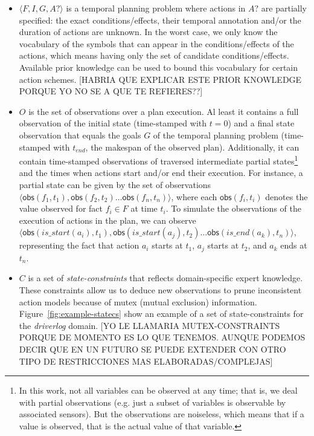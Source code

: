 \documentclass{ecai}
\newcommand{\tup}[1]{{\langle #1 \rangle}}
\newcommand{\obs}{\mathsf{obs}}    %
\begin{document}
\begin{itemize}
	
\item $\tup{F,I,G,A?}$ is a temporal planning problem where actions in $A?$ are partially specified: the exact conditions/effects, their temporal annotation and/or the duration of actions are unknown. In the worst case, we only know the vocabulary of the symbols that can appear in the conditions/effects of the actions, which means having only the set of candidate conditions/effects. 
Available prior knowledge can be used to bound this vocabulary for certain action schemes. [HABRIA QUE EXPLICAR ESTE PRIOR KNOWLEDGE PORQUE YO NO SE A QUE TE REFIERES??]

\item $O$ is the set of observations over a plan execution. Al least it contains a full observation of the initial state (time-stamped with $t=0$) and a final state observation that equals the goals $G$ of the temporal planning problem (time-stamped with $t_{end}$, the makespan of the observed plan). Additionally, it can contain time-stamped observations of traversed intermediate partial states\footnote{In this work, not all variables can be observed at any time; that is, we deal with partial observations (e.g. just a subset of variables is observable by associated sensors). But the observations are noiseless, which means that if a value is observed, that is the actual value of that variable.} and the times when actions start and/or end their execution. For instance, a partial state can be given by the set of observations $\tup{\obs(f_1,t_1),\obs(f_2,t_2)\ldots \obs(f_n,t_n)}$, where each $\obs(f_i,t_i)$ denotes the value observed for fact $f_i \in F$ at time $t_i$. To simulate the observations of the execution of actions 
in the plan, we can observe $\tup{\obs(is\_start(a_i),t_1),\obs(is\_start(a_j),t_2)\ldots \obs(is\_end(a_k),t_n)}$, representing the fact that action $a_i$ starts at $t_1$, $a_j$ starts at $t_2$, and $a_k$ ends at $t_n$.


\item $C$ is a set of {\em state-constraints} that reflects domain-specific expert knowledge. These constraints allow us to deduce new observations to prune inconsistent action models because of mutex (mutual exclusion) information. Figure~\ref{fig:example-statecs} show an example of a set of state-constraints for the {\em driverlog} domain. [YO LE LLAMARIA MUTEX-CONSTRAINTS PORQUE DE MOMENTO ES LO QUE TENEMOS. AUNQUE PODEMOS DECIR QUE EN UN FUTURO SE PUEDE EXTENDER CON OTRO TIPO DE RESTRICCIONES MAS ELABORADAS/COMPLEJAS]

\end{itemize}
\end{document}
